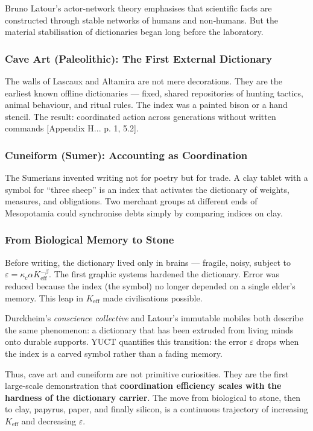 \documentclass[12pt,a4paper]{article}
\begin{document}
	Bruno Latour’s actor‑network theory emphasises that scientific facts are constructed through stable networks of humans and non‑humans. But the material stabilisation of dictionaries began long before the laboratory.
	
	\subsubsection{Cave Art (Paleolithic): The First External Dictionary}
	
	The walls of Lascaux and Altamira are not mere decorations. They are the earliest known offline dictionaries — fixed, shared repositories of hunting tactics, animal behaviour, and ritual rules. The index was a painted bison or a hand stencil. The result: coordinated action across generations without written commands [Appendix H... p. 1, 5.2].
	
	\subsubsection{Cuneiform (Sumer): Accounting as Coordination}
	
	The Sumerians invented writing not for poetry but for trade. A clay tablet with a symbol for “three sheep” is an index that activates the dictionary of weights, measures, and obligations. Two merchant groups at different ends of Mesopotamia could synchronise debts simply by comparing indices on clay.
	
	\subsubsection{From Biological Memory to Stone}
	
	Before writing, the dictionary lived only in brains — fragile, noisy, subject to \(\varepsilon = \kappa_c \alpha K_{\mathrm{eff}}^{-\beta}\). The first graphic systems hardened the dictionary. Error was reduced because the index (the symbol) no longer depended on a single elder’s memory. This leap in \(K_{\mathrm{eff}}\) made civilisations possible.
	
	Durckheim’s \emph{conscience collective} and Latour’s immutable mobiles both describe the same phenomenon: a dictionary that has been extruded from living minds onto durable supports. YUCT quantifies this transition: the error \(\varepsilon\) drops when the index is a carved symbol rather than a fading memory.
	
	Thus, cave art and cuneiform are not primitive curiosities. They are the first large‑scale demonstration that \textbf{coordination efficiency scales with the hardness of the dictionary carrier}. The move from biological to stone, then to clay, papyrus, paper, and finally silicon, is a continuous trajectory of increasing \(K_{\mathrm{eff}}\) and decreasing \(\varepsilon\).
	
\end{document}
